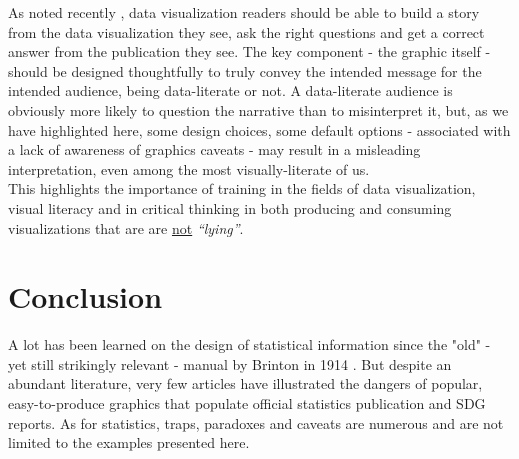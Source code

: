 \documentclass[11pt,twoside,a4paper]{article}
\begin{document}
As noted recently \citep{sabbati2022Literacy}, data visualization readers should be able to build a story from the data visualization they see, ask the right questions and get a correct answer from the publication they see. The key component - the graphic itself - should be designed thoughtfully to truly convey the intended message for the intended audience,  being data-literate or not. A data-literate audience is obviously more likely to question the narrative than to misinterpret it, but, as we have highlighted here, some design choices, some default options - associated with a lack of awareness of graphics caveats - may result in a misleading interpretation, even among the most visually-literate of us. \\

This highlights  the importance of training in the fields of data visualization, visual literacy and in critical thinking in both producing and consuming visualizations that are are \underline{not} \textit{``lying''}. 

\section{ Conclusion}

A lot has been learned on the design of statistical information since the "old" - yet still strikingly relevant -  manual by Brinton in 1914 \citep{Brinton1914}. But despite an abundant literature, very few articles have illustrated the dangers of popular, easy-to-produce graphics that populate official statistics publication and SDG reports. As for statistics, traps, paradoxes and caveats are numerous and are not limited to the  examples presented here.\\
\end{document}
